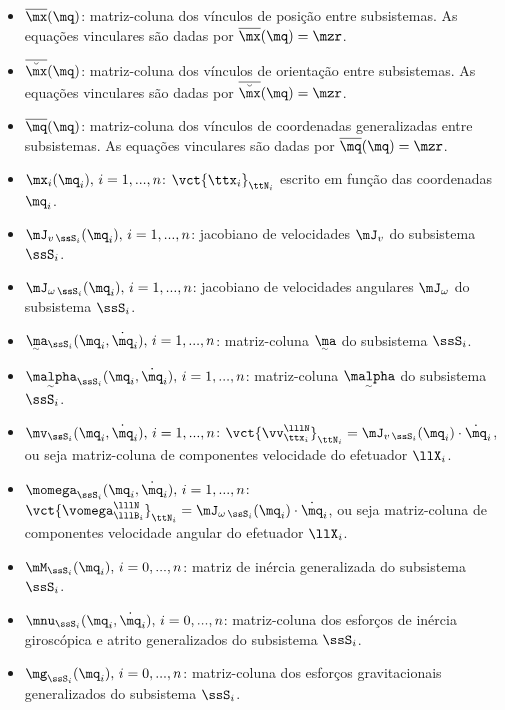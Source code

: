 \documentclass[]{politex}
\begin{document}
\begin{itemize}
\item $\overline{\mx}(\mq)$: matriz-coluna dos vínculos de posição entre subsistemas. As equações vinculares são dadas por $\overline{\mx}(\mq) = \mzr $.
\item $\overline{\breve{\mx}}(\mq)$: matriz-coluna dos vínculos de orientação entre subsistemas. As equações vinculares são dadas por $\overline{\breve{\mx}}(\mq) = \mzr $.
\item $\overline{\mq}(\mq)$: matriz-coluna dos vínculos de coordenadas generalizadas entre subsistemas. As equações vinculares são dadas por $\overline{\mq}(\mq) = \mzr $.
\item $\mx_i(\mq_i), \,i=1, ..., n$: $\vct{\ttx_i}_{\ttN_i}$ escrito em função das coordenadas $\mq_i$.
\item $\mJ_{v\,\ssS_i}(\mq_i), \,i=1, ..., n$: jacobiano de velocidades $\mJ_v$ do subsistema $\ssS_i$.
\item $\mJ_{\omega\,\ssS_i}(\mq_i), \,i=1, ..., n$: jacobiano de velocidades angulares $\mJ_\omega$ do subsistema $\ssS_i$.
\item $\underaccent{\sim}{\ma}_{\ssS_i}(\mq_i, \dot{\mq}_i), \,i=1, ..., n$: matriz-coluna $\underaccent{\sim}{\ma}$ do subsistema $\ssS_i$.
\item $\underaccent{\sim}{\malpha}_{\ssS_i}(\mq_i, \dot{\mq}_i), \,i=1, ..., n$: matriz-coluna $\underaccent{\sim}{\malpha}$ do subsistema $\ssS_i$.
\item $\mv_{\ssS_i}(\mq_i, \dot{\mq}_i), \,i=1, ..., n$: $\vct{\vv_{\ttx_i}^{\lllN}}_{\ttN_i} = \mJ_{v\,\ssS_i}(\mq_i) \cdot \dot{\mq}_i$, ou seja matriz-coluna de componentes velocidade do efetuador $\llX_i$.
\item $\momega_{\ssS_i}(\mq_i, \dot{\mq}_i), \,i=1, ..., n$: $\vct{\vomega_{\lllB_i}^{\lllN}}_{\ttN_i} = \mJ_{\omega\,\ssS_i}(\mq_i) \cdot \dot{\mq}_i$, ou seja matriz-coluna de componentes velocidade angular do efetuador $\llX_i$.
\item $\mM_{\ssS_i}(\mq_i), \,i=0, ..., n$: matriz de in\'ercia generalizada do subsistema $\ssS_i$.
\item $\mnu_{\ssS_i}(\mq_i, \dot{\mq}_i), \,i=0, ..., n$: matriz-coluna dos esforços de inércia girosc\'opica e atrito generalizados do subsistema $\ssS_i$.
\item $\mg_{\ssS_i}(\mq_i), \,i=0, ..., n$: matriz-coluna dos esfor\c{c}os gravitacionais generalizados do subsistema $\ssS_i$.

\end{itemize}
\end{document}
